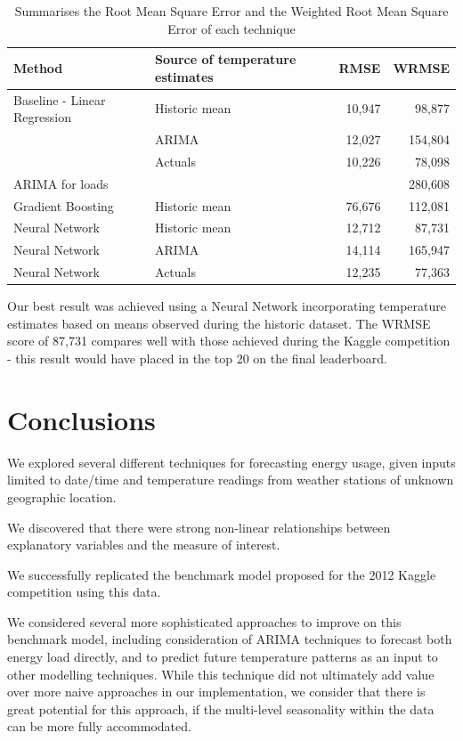 \documentclass{article} %
\begin{document}
\begin{table}[H]
  \begin{tabular}{l l r r}
    Method &
    Source of temperature estimates &
    RMSE & WRMSE \\
    \hline
    Baseline - Linear Regression &
    Historic mean &
    10,947 & 98,877 \\
    &
    ARIMA	&
    12,027 & 154,804 \\
    &
    Actuals &
    10,226 & 78,098 \\ \hline
    ARIMA for loads &
    &
    & 280,608 \\ \hline
    Gradient Boosting &
    Historic mean &
    76,676 & 112,081 \\ \hline
    Neural Network &
    Historic mean &
    12,712 & 87,731 \\
    Neural Network &
    ARIMA &
    14,114 & 165,947 \\
    Neural Network &
    Actuals &
    12,235 & 77,363 \\
    \hline
  \end{tabular}
  \caption{Summarises the Root Mean Square Error and the Weighted Root Mean Square Error of each technique}
  \label{tab:error_comp}
\end{table}

Our best result was achieved using a Neural Network incorporating temperature estimates based on means observed during the historic dataset.  The WRMSE score of 87,731 compares well with those achieved during the Kaggle competition - this result would have placed in the top 20 on the final leaderboard.


\section*{Conclusions}
We explored several different techniques for forecasting energy usage, given inputs limited to date/time and temperature readings from weather stations of unknown geographic location.

We discovered that there were strong non-linear relationships between explanatory variables and the measure of interest.

We successfully replicated the benchmark model proposed for the 2012 Kaggle competition using this data.

We considered several more sophisticated approaches to improve on this benchmark model, including consideration of ARIMA techniques to forecast both energy load directly, and to predict future temperature patterns as an input to other modelling techniques.  While this technique did not ultimately add value over more naive approaches in our implementation, we consider that there is great potential for this approach, if the multi-level seasonality within the data can be more fully accommodated.
\end{document}
